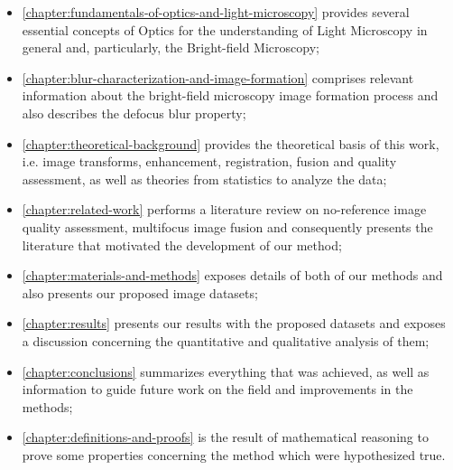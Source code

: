 \begin{itemize}
    \item \autoref{chapter:fundamentals-of-optics-and-light-microscopy} provides several essential concepts of Optics for the understanding of Light Microscopy in general and, particularly, the Bright-field Microscopy;
    
    \item \autoref{chapter:blur-characterization-and-image-formation} comprises relevant information about the bright-field microscopy image formation process and also describes the defocus blur property;
    
    \item \autoref{chapter:theoretical-background} provides the theoretical basis of this work, i.e. image transforms, enhancement, registration, fusion and quality assessment, as well as theories from statistics to analyze the data;
    
    \item \autoref{chapter:related-work} performs a literature review on no-reference image quality assessment, multifocus image fusion and consequently presents the literature that motivated the development of our method;
    
    \item \autoref{chapter:materials-and-methods} exposes details of both of our methods and also presents our proposed image datasets;
    
    \item \autoref{chapter:results} presents our results with the proposed datasets and exposes a discussion concerning the quantitative and qualitative analysis of them;
    
    \item \autoref{chapter:conclusions} summarizes everything that was achieved, as well as information to guide future work on the field and improvements in the methods;
    
    \item \autoref{chapter:definitions-and-proofs} is the result of mathematical reasoning to prove some properties concerning the method which were hypothesized true.
    
\end{itemize}
